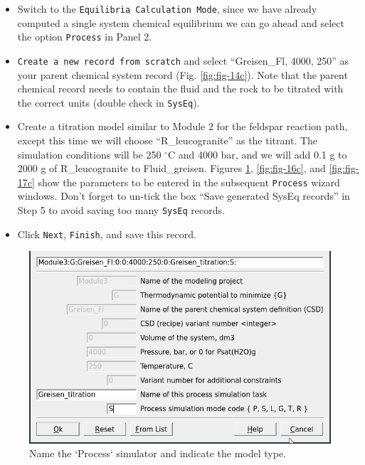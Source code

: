 \documentclass[
]{book}
\begin{document}
\begin{itemize}
\item
  Switch to the \texttt{Equilibria\ Calculation\ Mode}, since we have already computed a single system chemical equilibrium we can go ahead and select the option \texttt{Process} in Panel 2.
\item
  \texttt{Create\ a\ new\ record\ from\ scratch} and select ``Greisen\_Fl, 4000, 250'' as your parent chemical system record (Fig. \ref{fig:fig-14c}). Note that the parent chemical record needs to contain the fluid and the rock to be titrated with the correct units (double check in \texttt{SysEq}).
\item
  Create a titration model similar to Module 2 for the feldspar reaction path, except this time we will choose ``R\_leucogranite'' as the titrant. The simulation conditions will be 250 \(^\circ\)C and 4000 bar, and we will add 0.1 g to 2000 g of R\_leucogranite to Fluid\_greisen. Figures \ref{fig:fig-15c}, \ref{fig:fig-16c}, and \ref{fig:fig-17c} show the parameters to be entered in the subsequent \texttt{Process} wizard windows. Don't forget to un-tick the box ``Save generated SysEq records'' in Step 5 to avoid saving too many \texttt{SysEq} records.
\item
  Click \texttt{Next}, \texttt{Finish}, and save this record.
\end{itemize}

\begin{figure}
\includegraphics[width=0.7\linewidth]{figures/module3/fig-15} \caption{Name the `Process` simulator and indicate the model type.}\label{fig:fig-15c}
\end{figure}
\end{document}
